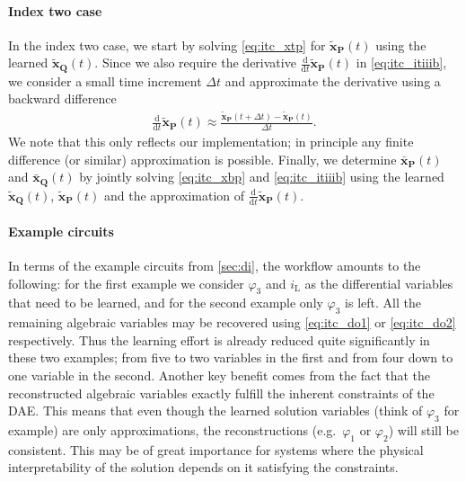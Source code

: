\documentclass[AMA,STIX1COL]{WileyNJD-v2}
\newcommand{\mb}[1]{\mathbf{#1}}
\newcommand{\mbt}[1]{\tilde{\mathbf{#1}}}
\newcommand{\mbb}[1]{\bar{\mathbf{#1}}}
\newcommand{\mr}[1]{\mathrm{#1}}
\newcommand{\ddt}{\frac{\mathrm{d}}{\mathrm{d}t}}
\begin{document}
\paragraph{Index two case}
In the index two case, we start by solving \eqref{eq:itc_xtp} for $\mbt{x}_\mb{P}(t)$ using the learned $\mbt{x}_\mb{Q}(t)$. Since we also require the derivative $\ddt \mbt{x}_\mb{P}(t)$ in \eqref{eq:itc_itiiib}, we consider a small time increment $\Delta t$ and approximate the derivative using a backward difference
\begin{align*}
    \ddt \mbt{x}_\mb{P}(t) \approx \frac{\mbt{x}_\mb{P}(t + \Delta t) - \mbt{x}_\mb{P}(t)}{\Delta t}.
\end{align*}
We note that this only reflects our implementation; in principle any finite difference (or similar) approximation is possible. Finally, we determine $\mbb{x}_\mb{P}(t)$ and $\mbb{x}_\mb{Q}(t)$ by jointly solving \eqref{eq:itc_xbp} and \eqref{eq:itc_itiiib} using the learned $\mbt{x}_\mb{Q}(t)$, $\mbt{x}_\mb{P}(t)$ and the approximation of $\ddt \mbt{x}_\mb{P}(t)$.

\paragraph{Example circuits}
In terms of the example circuits from \autoref{sec:di}, the workflow amounts to the following: for the first example we consider $\varphi_3$ and $i_\mr{L}$ as the differential variables that need to be learned, and for the second example only $\varphi_3$ is left. All the remaining algebraic variables may be recovered using \eqref{eq:itc_do1} or \eqref{eq:itc_do2} respectively. Thus the learning effort is already reduced quite significantly in these two examples; from five to two variables in the first and from four down to one variable in the second. Another key benefit comes from the fact that the reconstructed algebraic variables exactly fulfill the inherent constraints of the DAE. This means that even though the learned solution variables (think of $\varphi_3$ for example) are only approximations, the reconstructions (e.g.~$\varphi_1$ or $\varphi_2$) will still be consistent. This may be of great importance for systems where the physical interpretability of the solution depends on it satisfying the constraints.
\end{document}
